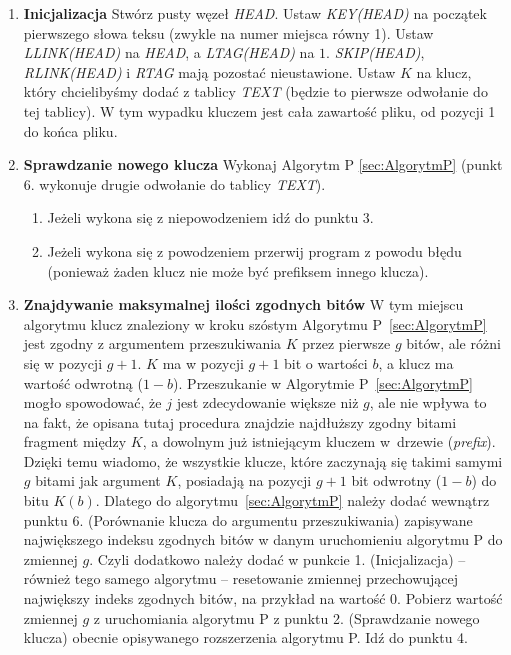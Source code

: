 	\begin{enumerate}
		\item \textbf{Inicjalizacja} \newline
		Stwórz pusty węzeł \emph{HEAD}. \newline
		Ustaw \emph{KEY(HEAD)} na początek pierwszego słowa teksu (zwykle na numer miejsca równy 1). \newline
		Ustaw \emph{LLINK(HEAD)} na \emph{HEAD}, a \emph{LTAG(HEAD)} na $1$.  \newline
		\emph{SKIP(HEAD)}, \emph{RLINK(HEAD)} i \emph{RTAG} mają pozostać nieustawione. \newline
		Ustaw $K$ na klucz, który chcielibyśmy dodać z tablicy \emph{TEXT} (będzie to pierwsze odwołanie do tej tablicy). W tym wypadku kluczem jest cała zawartość pliku, od pozycji 1 do końca pliku.
		\item \textbf{Sprawdzanie nowego klucza} \newline
		Wykonaj Algorytm P \ref{sec:AlgorytmP} (punkt 6. wykonuje drugie odwołanie do tablicy \emph{TEXT}).
		\begin{enumerate}
			\item Jeżeli wykona się z niepowodzeniem idź do punktu 3.
			\item Jeżeli wykona się z powodzeniem przerwij program z powodu błędu (ponieważ żaden klucz nie może być prefiksem innego klucza).
		\end{enumerate}
		
		\item \textbf{Znajdywanie maksymalnej ilości zgodnych bitów} \newline
		W tym miejscu algorytmu klucz znaleziony w kroku szóstym Algorytmu P~\ref{sec:AlgorytmP} jest zgodny z argumentem przeszukiwania $K$ przez pierwsze $g$ bitów, ale różni się w pozycji $g + 1$. \newline 
		$K$ ma w pozycji $g + 1$ bit o wartości $b$, a klucz ma wartość odwrotną ($1 - b$). \newline
		Przeszukanie w Algorytmie P~\ref{sec:AlgorytmP} mogło spowodować, że $j$ jest zdecydowanie większe niż $g$, ale nie wpływa to na fakt, że opisana tutaj procedura znajdzie najdłuższy zgodny bitami fragment między $K$, a dowolnym już istniejącym kluczem w~drzewie (\emph{prefix}). \newline
		Dzięki temu wiadomo, że wszystkie klucze, które zaczynają się takimi samymi $g$ bitami jak argument $K$, posiadają na pozycji $g + 1$ bit odwrotny ($1-b$) do bitu $K (b)$. \newline
		Dlatego do algorytmu~\ref{sec:AlgorytmP} należy dodać wewnątrz punktu 6. (Porównanie klucza do argumentu przeszukiwania) zapisywane największego indeksu zgodnych bitów w danym uruchomieniu algorytmu P do zmiennej $g$. Czyli dodatkowo należy dodać w punkcie 1. (Inicjalizacja) -- również tego samego algorytmu -- resetowanie zmiennej przechowującej największy indeks zgodnych bitów, na przykład na wartość 0. \newline
		Pobierz wartość zmiennej $g$ z uruchomiania algorytmu P z punktu 2. (Sprawdzanie nowego klucza) obecnie opisywanego rozszerzenia algorytmu P. \newline
		Idź do punktu 4. 
		

\end{enumerate}
